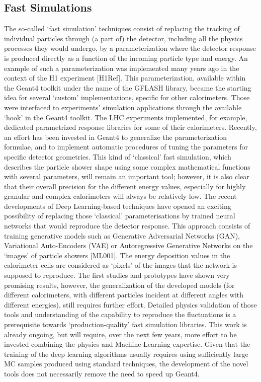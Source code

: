 \documentclass[10pt,a4paper]{article}
\begin{document}
\hypertarget{fast-simulations}{%
\subsection{Fast Simulations}\label{fast-simulations}}

The so-called `fast simulation' techniques consist of replacing the
tracking of individual particles through (a part of) the detector,
including all the physics processes they would undergo, by a
parameterization where the detector response is produced directly as a
function of the incoming particle type and energy. An example of such a
parameterization was implemented many years ago in the context of the H1
experiment {[}H1Ref{]}. This parameterization, available within the
Geant4 toolkit under the name of the GFLASH library, became the starting
idea for several `custom' implementations, specific for other
calorimeters. Those were interfaced to experiments' simulation
applications through the available `hook' in the Geant4 toolkit. The LHC
experiments implemented, for example, dedicated parametrized response
libraries for some of their calorimeters. Recently, an effort has been
invested in Geant4 to generalize the parameterization formulae, and to
implement automatic procedures of tuning the parameters for specific
detector geometries. This kind of `classical' fast simulation, which
describes the particle shower shape using some complex mathematical
functions with several parameters, will remain an important tool;
however, it is also clear that their overall precision for the different
energy values, especially for highly granular and complex calorimeters
will always be relatively low. The recent developments of Deep
Learning-based techniques have opened an exciting possibility of
replacing those `classical' parameterisations by trained neural networks
that would reproduce the detector response. This approach consists of
training generative models such as Generative Adversarial Networks
(GAN), Variational Auto-Encoders (VAE) or Autoregressive Generative
Networks on the `images' of particle showers {[}ML001{]}. The energy
deposition values in the calorimeter cells are considered as `pixels' of
the images that the network is supposed to reproduce. The first studies
and prototypes have shown very promising results, however, the
generalization of the developed models (for different calorimeters, with
different particles incident at different angles with different
energies), still requires further effort. Detailed physics validation of
those tools and understanding of the capability to reproduce the
fluctuations is a prerequisite towards `production-quality' fast
simulation libraries. This work is already ongoing, but will require,
over the next few years, more effort to be invested combining the
physics and Machine Learning expertise. Given that the training of the
deep learning algorithms usually requires using sufficiently large MC
samples produced using standard techniques, the development of the novel
tools does not necessarily remove the need to speed up Geant4.
\end{document}
